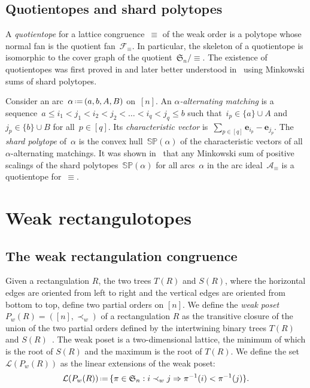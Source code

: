 \documentclass{amsart}
\theoremstyle{definition}
\renewcommand{\c}[1]{\mathcal{#1}} %
\renewcommand{\b}[1]{{\boldsymbol{#1}}} %
\newcommand{\f}[1]{\mathfrak{#1}} %
\newcommand{\eqdef}{\mbox{\,\raisebox{0.2ex}{\scriptsize\ensuremath{\mathrm:}}\ensuremath{=}\,}} %
\renewcommand{\implies}{\Rightarrow} %
\newcommand{\darkblue}{\color{darkblue}} %
\newcommand{\defn}[1]{\textsl{\darkblue #1}} %
\newcommand{\polytope}[1]{\mathds{#1}} %
\newcommand{\SP}{\polytope{SP}}
\begin{document}
\subsection{Quotientopes and shard polytopes}

A \defn{quotientope} for a lattice congruence~$\equiv$ of the weak order is a polytope whose normal fan is the quotient fan~$\c{F}_\equiv$.
In particular, the skeleton of a quotientope is isomorphic to the cover graph of the quotient~$\f{S}_n/{\equiv}$.
The existence of quotientopes was first proved in \cite{PilaudSantos} and later better understood in~\cite{PadrolPilaudRitter} using Minkowski sums of shard polytopes.

Consider an arc~$\alpha \eqdef (a, b, A, B)$ on~$[n]$.
An \defn{$\alpha$-alternating matching} is a sequence~$a \le i_1 < j_1 < i_2 < j_2 < \dots < i_q < j_q \le b$ such that~$i_p \in \{a\} \cup A$ and~$j_p \in \{b\} \cup B$ for all~$p \in [q]$.
Its \defn{characteristic vector} is~$\sum_{p \in [q]} \b{e}_{i_p} - \b{e}_{j_p}$.
The \defn{shard polytope} of~$\alpha$ is the convex hull~$\SP(\alpha)$ of the characteristic vectors of all $\alpha$-alternating matchings.
It was shown in~\cite{PadrolPilaudRitter} that any Minkowski sum of positive scalings of the shard polytopes~$\SP(\alpha)$ for all arcs~$\alpha$ in the arc ideal~$\c{A}_\equiv$ is a quotientope for~$\equiv$.


\section{Weak rectangulotopes}
\label{sec:wr}


\subsection{The weak rectangulation congruence}

Given a rectangulation $R$, the two trees $T(R)$ and $S(R)$, where the horizontal edges are oriented from left to right and the vertical edges are oriented from bottom to top,
define two partial orders on $[n]$.
We define the \defn{weak poset} $P_w(R)=([n],\prec_w)$ of a rectangulation $R$ as the transitive closure of the union of the two partial orders defined by the intertwining binary trees $T(R)$ and $S(R)$~\cite{MR4014603}.
The weak poset is a two-dimensional lattice, the minimum of which is the root of $S(R)$ and the maximum is the root of $T(R)$.
We define the set $\mathcal{L}(P_w(R))$ as the linear extensions of the weak poset:
\[
\mathcal{L}(P_w(R)) \eqdef \{\pi\in\f{S}_n : i\prec_w j\implies \pi^{-1}(i) < \pi^{-1}(j)\}.
\]
\end{document}
